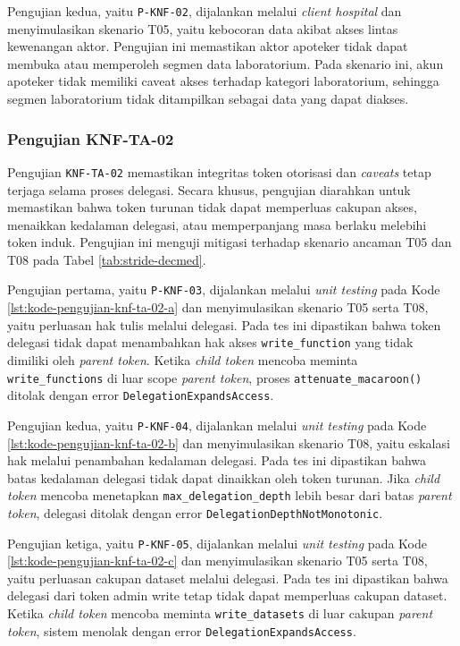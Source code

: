 Pengujian kedua, yaitu \texttt{P-KNF-02}, dijalankan melalui \textit{client hospital} dan menyimulasikan skenario T05, yaitu kebocoran data akibat akses lintas kewenangan aktor. Pengujian ini memastikan aktor apoteker tidak dapat membuka atau memperoleh segmen data laboratorium. Pada skenario ini, akun apoteker tidak memiliki caveat akses terhadap kategori laboratorium, sehingga segmen laboratorium tidak ditampilkan sebagai data yang dapat diakses.

\subsubsection{Pengujian KNF-TA-02}
\label{subsubsec:pengujian-knf-ta-02}

Pengujian \texttt{KNF-TA-02} memastikan integritas token otorisasi dan \textit{caveats} tetap terjaga selama proses delegasi. Secara khusus, pengujian diarahkan untuk memastikan bahwa token turunan tidak dapat memperluas cakupan akses, menaikkan kedalaman delegasi, atau memperpanjang masa berlaku melebihi token induk. Pengujian ini menguji mitigasi terhadap skenario ancaman T05 dan T08 pada Tabel \ref{tab:stride-decmed}.

Pengujian pertama, yaitu \texttt{P-KNF-03}, dijalankan melalui \textit{unit testing} pada Kode \ref{lst:kode-pengujian-knf-ta-02-a} dan menyimulasikan skenario T05 serta T08, yaitu perluasan hak tulis melalui delegasi. Pada tes ini dipastikan bahwa token delegasi tidak dapat menambahkan hak akses \texttt{write\_function} yang tidak dimiliki oleh \textit{parent token}. Ketika \textit{child token} mencoba meminta \texttt{write\_functions} di luar scope \textit{parent token}, proses \texttt{attenuate\_macaroon()} ditolak dengan error \texttt{DelegationExpandsAccess}.

Pengujian kedua, yaitu \texttt{P-KNF-04}, dijalankan melalui \textit{unit testing} pada Kode \ref{lst:kode-pengujian-knf-ta-02-b} dan menyimulasikan skenario T08, yaitu eskalasi hak melalui penambahan kedalaman delegasi. Pada tes ini dipastikan bahwa batas kedalaman delegasi tidak dapat dinaikkan oleh token turunan. Jika \textit{child token} mencoba menetapkan \texttt{max\_delegation\_depth} lebih besar dari batas \textit{parent token}, delegasi ditolak dengan error \texttt{DelegationDepthNotMonotonic}.

Pengujian ketiga, yaitu \texttt{P-KNF-05}, dijalankan melalui \textit{unit testing} pada Kode \ref{lst:kode-pengujian-knf-ta-02-c} dan menyimulasikan skenario T05 serta T08, yaitu perluasan cakupan dataset melalui delegasi. Pada tes ini dipastikan bahwa delegasi dari token admin write tetap tidak dapat memperluas cakupan dataset. Ketika \textit{child token} mencoba meminta \texttt{write\_datasets} di luar cakupan \textit{parent token}, sistem menolak dengan error \texttt{DelegationExpandsAccess}.

